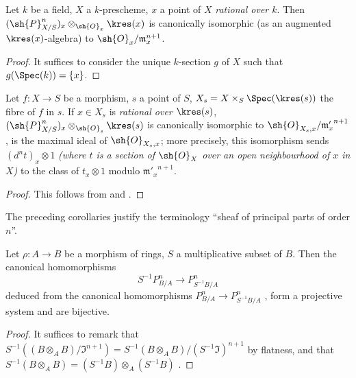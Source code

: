 \begin{corollary}[16.4.12]
\label{IV.16.4.12}
Let $k$ be a field, $X$ a $k$-prescheme, $x$ a point of $X$ \emph{rational over $k$}.
Then $(\sh{P}_{X/S}^n)_x \otimes_{\sh{O}_x} \kres(x)$ is canonically isomorphic (as an augmented $\kres(x)$-algebra) to $\sh{O}_x/\mathfrak{m}_x^{n+1}$.
\end{corollary}

\begin{proof}
It suffices to consider the unique $k$-section $g$ of $X$ such that $g(\Spec(k)) = \{x\}$.
\end{proof}

\begin{corollary}[16.4.13]
\label{IV.16.4.13}
Let $f: X \to S$ be a morphism, $s$ a point of $S$, $X_s = X \times_S \Spec(\kres(s))$ the fibre of $f$ in $s$.
If $x \in X_s$ is \emph{rational over $\kres(s)$}, $(\sh{P}_{X/S}^n)_x \otimes_{\sh{O}_s} \kres(s)$ is canonically isomorphic to $\sh{O}_{X_s, x}/{\mathfrak{m}'_x}^{n+1}$, is the maximal ideal of $\sh{O}_{X_s, x}$;
more precisely, this isomorphism sends $(d^n t)_x \otimes 1$ \emph{(where $t$ is a section of $\sh{O}_X$ over an open neighbourhood of $x$ in $X$)} to the class of $t_x \otimes 1$ modulo ${\mathfrak{m}'_x}^{n+1}$.
\end{corollary}

\begin{proof}
This follows from  and .
\end{proof}

The preceding corollaries justify the terminology ``sheaf of principal parts of order $n$''.

\begin{proposition}[16.4.14]
\label{IV.16.4.14}
Let $\rho:A \to B$ be a morphism of rings, $S$ a multiplicative subset of $B$.
Then the canonical homomorphisms 
\[
  \label{IV.16.4.14.1}
  S^{-1}P_{B/A}^n \to P_{S^{-1}B/A}^n
  \tag{16.4.14.1}
\] 
deduced from the canonical homomorphisms $P_{B/A}^n \to P_{S^{-1}B/A}^n$ , form a projective system and are bijective.
\end{proposition}

\begin{proof}
It suffices to remark that $S^{-1}((B \otimes_A B)/\mathfrak{I}^{n+1}) = S^{-1}(B \otimes_A B)/(S^{-1}\mathfrak{I})^{n+1}$ by flatness, and that $S^{-1}(B \otimes_A B) = (S^{-1}B)\otimes_A (S^{-1}B) $ .
\end{proof}

